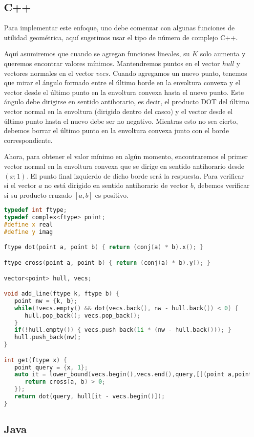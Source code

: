 \subsection{C++}
Para implementar este enfoque, uno debe comenzar con algunas funciones de utilidad geométrica, aquí sugerimos usar el tipo de número de complejo C++. 

Aquí asumiremos que cuando se agregan funciones lineales, su $K$ solo aumenta y queremos encontrar valores mínimos. Mantendremos puntos en el vector $hull$ y vectores normales en el vector $vecs$. Cuando agregamos un nuevo punto, tenemos que mirar el ángulo formado entre el último borde en la envoltura convexa y el vector desde el último punto en la envoltura convexa hasta el nuevo punto. Este ángulo debe dirigirse en sentido antihorario, es decir, el producto DOT del último vector normal en la envoltura (dirigido dentro del casco) y el vector desde el último punto hasta el nuevo debe ser no negativo. Mientras esto no sea cierto, debemos borrar el último punto en la envoltura convexa junto con el borde correspondiente.

Ahora, para obtener el valor mínimo en algún momento, encontraremos el primer vector normal en la envoltura convexa que se dirige en sentido antihorario desde $(x; 1)$. El punto final izquierdo de dicho borde será la respuesta. Para verificar si el vector $a$ no está dirigido en sentido antihorario de vector $b$, debemos verificar si su producto cruzado $[a,b]$ es positivo.

\begin{lstlisting}[language=C++]
typedef int ftype;
typedef complex<ftype> point;
#define x real
#define y imag

ftype dot(point a, point b) { return (conj(a) * b).x(); }

ftype cross(point a, point b) { return (conj(a) * b).y(); }

vector<point> hull, vecs;

void add_line(ftype k, ftype b) { 
   point nw = {k, b};
   while(!vecs.empty() && dot(vecs.back(), nw - hull.back()) < 0) {
      hull.pop_back(); vecs.pop_back();
   }
   if(!hull.empty()) { vecs.push_back(1i * (nw - hull.back())); }
   hull.push_back(nw);
}

int get(ftype x) {
   point query = {x, 1};
   auto it = lower_bound(vecs.begin(),vecs.end(),query,[](point a,point b) {
      return cross(a, b) > 0;
   });
   return dot(query, hull[it - vecs.begin()]);
}
\end{lstlisting}
\subsection{Java}

